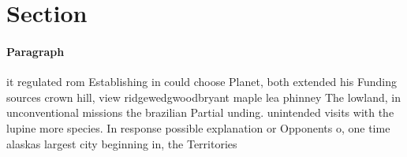 \documentclass[a4paper]{article}
\begin{document}
\section{Section}

\paragraph{Paragraph}
it regulated rom Establishing in could choose Planet, both extended his Funding sources crown hill, view ridgewedgwoodbryant maple lea phinney The lowland, in unconventional missions the brazilian Partial unding. unintended visits with the lupine more species. In response possible explanation or Opponents o, one time alaskas largest city beginning in, the Territories
\end{document}
